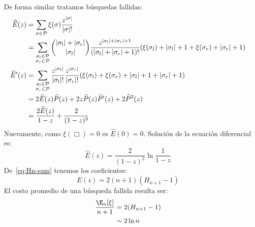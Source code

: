   De forma similar tratamos búsquedas fallidas:
  \begin{align}
    \widehat{E}(z)
      &= \sum_{\sigma \in \mathcal{P}}
	   \xi(\sigma)
	   \frac{z^{\lvert \sigma \rvert}}{\lvert \sigma \rvert !}
	      \label{eq:BST-E-def} \\
      &= \sum_{\substack{\sigma_l \in \mathcal{P} \\
			 \sigma_r \in \mathcal{P}}}
	   \binom{\lvert \sigma_l \rvert + \lvert \sigma_r \lvert}
		 {\lvert \sigma_l \rvert}
	   \frac{z^{\lvert \sigma_l \rvert + \lvert \sigma_r \rvert + 1}}
		{(\lvert \sigma_l \rvert + \lvert \sigma_r \rvert + 1)!}
	   (\xi(\sigma_l) + \lvert \sigma_l \rvert + 1
	      + \xi(\sigma_r) + \lvert \sigma_r \rvert + 1)
	      \label{eq:BST-E-decomposed} \\
    \widehat{E}'(z)
      &= \sum_{\substack{\sigma_l \in \mathcal{P} \notag \\
			 \sigma_r \in \mathcal{P}}}
	   \frac{z^{\lvert \sigma_l \rvert}}{\lvert \sigma_l \rvert !}
	   \frac{z^{\lvert \sigma_r \rvert}}{\lvert \sigma_r \rvert !}
	   (\xi(\sigma_l) + \xi(\sigma_r)
	      + \lvert \sigma_l \rvert + 1
	      + \lvert \sigma_r \rvert + 1) \notag \\
      &= 2 \widehat{E}(z) \widehat{P}(z)
	   + 2 z \widehat{P}(z) \widehat{P}'(z)
	   + 2 \widehat{P}^2(z) \notag \\
      &= \frac{2 \widehat{E}(z)}{1 - z} + \frac{2}{(1 - z)^3}
	      \label{eq:BST-E-ode}
  \end{align}
  Nuevamente,
  como \(\xi(\Box) = 0\) es \(\widehat{E}(0) = 0\).
  Solución de la ecuación diferencial es:
  \begin{equation}
    \label{eq:BST-E-explicit}
    \widehat{E}(z)
      = \frac{2}{(1 - z)^2} \ln \frac{1}{1 - z}
  \end{equation}
  De~\eqref{eq:Hn-sum} tenemos los coeficientes:
  \begin{equation*}
    [z^n] E(z)
      = 2 (n + 1) (H_{n + 1} - 1)
  \end{equation*}
  El costo promedio de una búsqueda fallida resulta ser:%
  \begin{align}
    \frac{\E_n[\xi]}{n + 1}
      &=   2 (H_{n + 1} - 1)
		      \label{eq:BST-En-xi-explicit} \\
      &\sim 2 \ln n
		      \label{eq:BST-En-xi-asy}
  \end{align}

